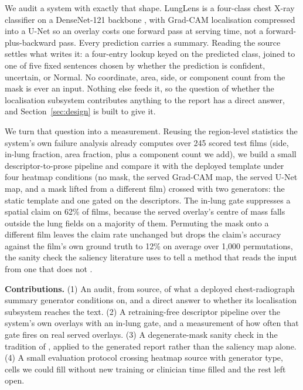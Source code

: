 \documentclass{article}
\begin{document}
We audit a system with exactly that shape. LungLens is a four-class chest X-ray classifier on a DenseNet-121 backbone \citep{huang2017densenet}, with Grad-CAM \citep{selvaraju2017gradcam} localisation compressed into a U-Net \citep{ronneberger2015unet} so an overlay costs one forward pass at serving time, not a forward-plus-backward pass. Every prediction carries a summary. Reading the source settles what writes it: a four-entry lookup keyed on the predicted class, joined to one of five fixed sentences chosen by whether the prediction is confident, uncertain, or Normal. No coordinate, area, side, or component count from the mask is ever an input. Nothing else feeds it, so the question of whether the localisation subsystem contributes anything to the report has a direct answer, and Section~\ref{sec:design} is built to give it.

We turn that question into a measurement. Reusing the region-level statistics the system's own failure analysis already computes over 245 scored test films (side, in-lung fraction, area fraction, plus a component count we add), we build a small descriptor-to-prose pipeline and compare it with the deployed template under four heatmap conditions (no mask, the served Grad-CAM map, the served U-Net map, and a mask lifted from a different film) crossed with two generators: the static template and one gated on the descriptors. The in-lung gate suppresses a spatial claim on 62\% of films, because the served overlay's centre of mass falls outside the lung fields on a majority of them. Permuting the mask onto a different film leaves the claim rate unchanged but drops the claim's accuracy against the film's own ground truth to 12\% on average over 1{,}000 permutations, the sanity check the saliency literature uses to tell a method that reads the input from one that does not \citep{adebayo2018sanitychecks}.

\textbf{Contributions.} (1) An audit, from source, of what a deployed chest-radiograph summary generator conditions on, and a direct answer to whether its localisation subsystem reaches the text. (2) A retraining-free descriptor pipeline over the system's own overlays with an in-lung gate, and a measurement of how often that gate fires on real served overlays. (3) A degenerate-mask sanity check in the tradition of \citet{adebayo2018sanitychecks}, applied to the generated report rather than the saliency map alone. (4) A small evaluation protocol crossing heatmap source with generator type, cells we could fill without new training or clinician time filled and the rest left open.
\end{document}
